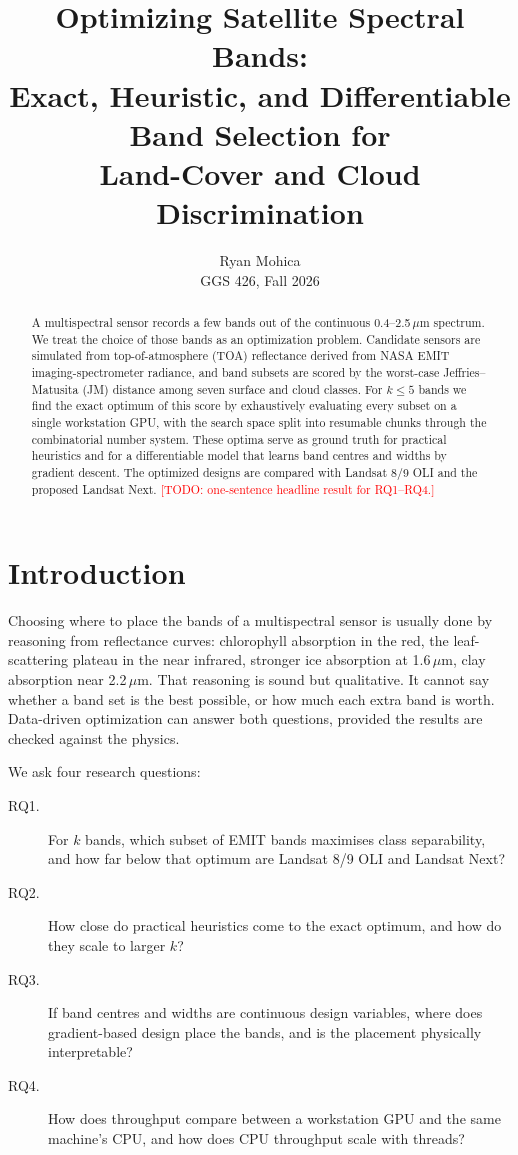 \documentclass[11pt]{article}
\title{Optimizing Satellite Spectral Bands:\\[2pt]
\large Exact, Heuristic, and Differentiable Band Selection for\\
Land-Cover and Cloud Discrimination}
\author{Ryan Mohica\\GGS 426, Fall 2026}
\date{\todo{submission date}}
\newcommand{\todo}[1]{\textnormal{\textcolor{red}{[TODO: #1]}}}
\newcommand{\um}{\,\ensuremath{\mu}m}
\begin{document}
\maketitle

\begin{abstract}
A multispectral sensor records a few bands out of the continuous 0.4--2.5\um{}
spectrum. We treat the choice of those bands as an optimization problem.
Candidate sensors are simulated from top-of-atmosphere (TOA) reflectance derived
from NASA EMIT imaging-spectrometer radiance, and band subsets are scored by the
worst-case Jeffries--Matusita (JM) distance among seven surface and cloud
classes. For $k \le 5$ bands we find the exact optimum of this score by
exhaustively evaluating every subset on a single workstation GPU, with the
search space split into resumable chunks through the combinatorial number
system. These optima
serve as ground truth for practical heuristics and for a differentiable model
that learns band centres and widths by gradient descent. The optimized designs
are compared with Landsat 8/9 OLI and the proposed Landsat Next.
\todo{one-sentence headline result for RQ1--RQ4.}
\end{abstract}

\section{Introduction}

Choosing where to place the bands of a multispectral sensor is usually done by
reasoning from reflectance curves: chlorophyll absorption in the red, the
leaf-scattering plateau in the near infrared, stronger ice absorption at
1.6\um, clay absorption near 2.2\um. That reasoning is sound but qualitative. It
cannot say whether a band set is the best possible, or how much each extra band
is worth. Data-driven optimization can answer both questions, provided the
results are checked against the physics.

We ask four research questions:
\begin{description}
  \item[RQ1.] For $k$ bands, which subset of EMIT bands maximises class
    separability, and how far below that optimum are Landsat 8/9 OLI and
    Landsat Next?
  \item[RQ2.] How close do practical heuristics come to the exact optimum, and
    how do they scale to larger $k$?
  \item[RQ3.] If band centres and widths are continuous design variables, where
    does gradient-based design place the bands, and is the placement physically
    interpretable?
  \item[RQ4.] How does throughput compare between a workstation GPU and the
    same machine's CPU, and how does CPU throughput scale with threads?
\end{description}
\end{document}
